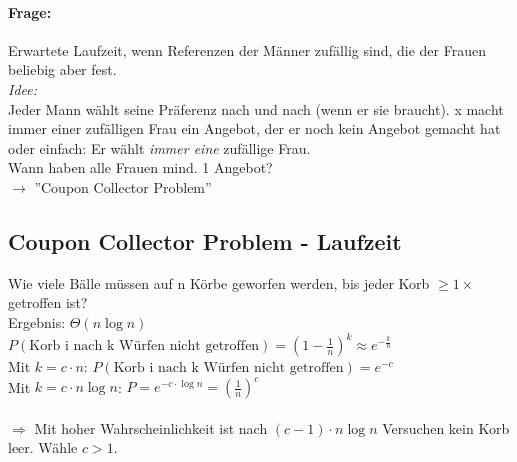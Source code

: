 				\paragraph{Frage:}
					Erwartete Laufzeit, wenn Referenzen der Männer zufällig sind, die der Frauen beliebig aber fest.\\
					\emph{Idee:}\\
					Jeder Mann wählt seine Präferenz nach und nach (wenn er sie braucht).
					x macht immer einer zufälligen Frau ein Angebot, der er noch kein Angebot gemacht hat oder einfach: Er wählt \emph{immer eine} zufällige Frau.\\
					Wann haben alle Frauen mind. 1 Angebot?\\
					$\rightarrow$ ''Coupon Collector Problem''
		\subsection{Coupon Collector Problem - Laufzeit}
			Wie viele Bälle müssen auf n Körbe geworfen werden, bis jeder Korb $\geq 1\times$ getroffen ist?\\
			
			Ergebnis: $\Theta(n\log n)$\\
			
			$P(\text{Korb i nach k Würfen nicht getroffen})=\left( 1-\frac{1}{n}\right)^k\approx e^{-\frac{k}{n}}$\\
			Mit $k=c\cdot n$: $P(\text{Korb i nach k Würfen nicht getroffen})=e^{-c}$\\
			Mit $k=c\cdot n\log n$: $P=e^{-c\cdot \log n}=\left(\frac{1}{n}\right)^c$\\\\
			$\Rightarrow$ Mit hoher Wahrscheinlichkeit ist nach $(c-1)\cdot n\log n$ Versuchen kein Korb leer. Wähle $c>1$.
			
        	